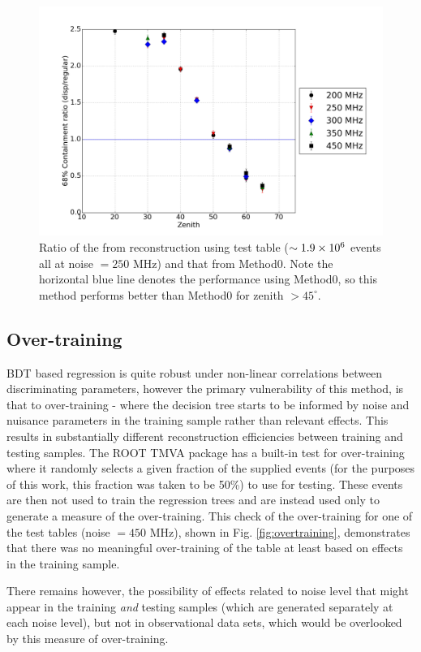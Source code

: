 \documentclass[main.tex]{subfiles}
\begin{document}
\begin{figure}[htbp]
  \centering
  \includegraphics[width=0.75\linewidth]{images/disp_250_ratio_xzen}
  \caption[Test \disp table reconstruction (noise = $250$ MHz).]{Ratio of the \rse from reconstruction using test \disp table ($\sim 1.9\times 10^{6}$ events all at noise $= 250$ MHz) and that from Method0. Note the horizontal blue line denotes the performance using Method0, so this method performs better than Method0 for zenith $>45^\circ$.}
  \label{fig:disp_ratio_250}
\end{figure}

\subsection{Over-training}
BDT based regression is quite robust under non-linear correlations between discriminating parameters, however the primary vulnerability of this method, is that  to over-training - where the decision tree starts to be informed by noise and nuisance parameters in the training sample rather than relevant effects. This results in substantially different reconstruction efficiencies between training and testing samples. The ROOT TMVA package has a built-in test for over-training where it randomly selects a given fraction of the supplied events (for the purposes of this work, this fraction was taken to be 50\%) to use for testing. These events are then not used to train the regression trees and are instead used only to generate a measure of the over-training.
This check of the over-training for one of the test tables (noise $= 450$ MHz), shown in Fig. \ref{fig:overtraining}, demonstrates that there was no meaningful over-training of the table at least based on effects in the training sample.

There remains however, the possibility of effects related to noise level that might appear in the training \textit{and} testing samples (which are generated separately at each noise level), but not in observational data sets, which would be overlooked by this measure of over-training.
\end{document}

